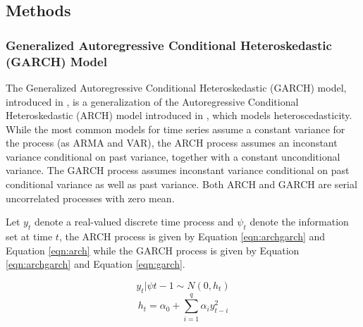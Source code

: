 \documentclass[a4paper]{article}
\begin{document}
\begin{comment}

On ten of October 2015 a impeachment request for president Dilma Rousseff was handed to the Chamber Of Representatives' president, who accepted the request on December second. The opening of the impeachment process was accepted by the special impeachment committee on eleven of April 2016.

\end{comment}


\subsection{Methods}

\subsubsection{Generalized Autoregressive Conditional Heteroskedastic (GARCH) Model}

The Generalized Autoregressive Conditional Heteroskedastic (GARCH) model, introduced in \citet{bollerslev1986}, is a generalization of the Autoregressive Conditional Heteroskedastic (ARCH) model introduced in \citet{engle1982}, which models heteroscedasticity. While the most common models for time series assume a constant variance for the process (as ARMA and VAR), the ARCH process assumes an inconstant variance conditional on past variance, together with a constant unconditional variance. The GARCH process assumes inconstant variance conditional on past conditional variance as well as past variance. Both ARCH and GARCH are serial uncorrelated processes with zero mean.

Let $y_t$ denote a real-valued discrete time process and $\psi_t$ denote the information set at time $t$, the ARCH process is given by Equation \ref{eqn:archgarch} and Equation \ref{eqn:arch} while the GARCH process is given by Equation \ref{eqn:archgarch} and Equation \ref{eqn:garch}.

\begin{equation}
\label{eqn:archgarch}
y_t | \psi{t-1} \sim N(0,h_t)
\end{equation}
\begin{equation}
\label{eqn:arch}
h_t = \alpha_0 + \displaystyle\sum_{i=1}^{q} \alpha_i y_{t-i}^2
\end{equation}
\end{document}
